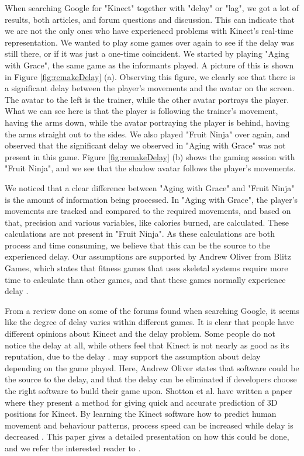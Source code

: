 When searching Google for "Kinect" together with "delay" or "lag", we got a lot of results, both articles, and forum questions and discussion. This can indicate that we are not the only ones who have experienced problems with Kinect's real-time representation. We wanted to play some games over again to see if the delay was still there, or if it was just a one-time coincident. We started by playing "Aging with Grace", the same game as the informants played. A picture of this is shown in Figure \ref{fig:remakeDelay} (a). Observing this figure, we clearly see that there is a significant delay between the player's movements and the avatar on the screen. The avatar to the left is the trainer, while the other avatar portrays the player. What we can see here is that the player is following the trainer's movement, having the arms down, while the avatar portraying the player is behind, having the arms straight out to the sides. We also played "Fruit Ninja" over again, and observed that the significant delay we observed in "Aging with Grace" was not present in this game. Figure \ref{fig:remakeDelay} (b) shows the gaming session with "Fruit Ninja", and we see that the shadow avatar follows the player's movements.



We noticed that a clear difference between "Aging with Grace" and "Fruit Ninja" is the amount of information being processed. In "Aging with Grace", the player's movements are tracked and compared to the required movements, and based on that, precision and various variables, like calories burned, are calculated. These calculations are not present in "Fruit Ninja". As these calculations are both process and time consuming, we believe that this can be the source to the experienced delay. Our assumptions are supported by Andrew Oliver from Blitz Games, which states that fitness games that uses skeletal systems require more time to calculate than other games, and that these games normally experience delay \cite{kinectLag}. 

From a review done on some of the forums found when searching Google, it seems like the degree of delay varies within different games. It is clear that people have different opinions about Kinect and the delay problem. Some people do not notice the delay at all, while others feel that Kinect is not nearly as good as its reputation, due to the delay \cite{kinectLagForum1} \cite{kinectLagForum2}. \cite{kinectLag} may support the assumption about delay depending on the game played. Here, Andrew Oliver states that software could be the source to the delay, and that the delay can be eliminated if developers choose the right software to build their game upon. Shotton et al. \cite{artikkelKinectLag} have written a paper where they present a method for giving quick and accurate prediction of 3D positions for Kinect. By learning the Kinect software how to predict human movement and behaviour patterns, process speed can be increased while delay is decreased \cite{artikkelKinectLag} \cite{artikkelKinectLagIntro}. This paper gives a detailed presentation on how this could be done, and we refer the interested reader to \cite{artikkelKinectLag}.       

